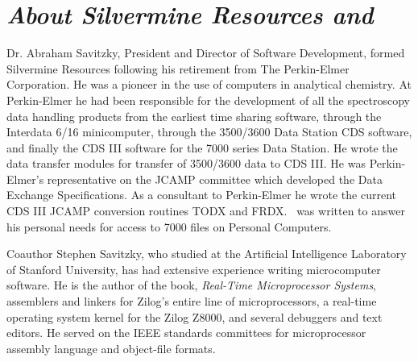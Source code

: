  
\newpage



\section*{{\sl About Silvermine Resources and \RD}}


Dr. Abraham Savitzky, President and Director of Software Development,
formed Silvermine Resources following his retirement from The
Perkin-Elmer Corporation.  He was a pioneer in the use of computers in
analytical chemistry.\cite{as1,as2} At Perkin-Elmer he had been
responsible for the development of all the spectroscopy data handling
products from the earliest time sharing software, through the
Interdata 6/16 minicomputer, through the 3500/3600 Data Station CDS
software, and finally the CDS III software for the 7000 series Data
Station.  He wrote the data transfer modules for transfer of 3500/3600
data to CDS III.  He was Perkin-Elmer's representative on the JCAMP
committee which developed the Data Exchange
Specifications.\cite{JCAMP} As a consultant to Perkin-Elmer he wrote
the current CDS III JCAMP conversion routines TODX and FRDX.  \RD\ was
written to answer his personal needs for access to 7000 files on
Personal Computers.

Coauthor Stephen Savitzky, who studied at the Artificial Intelligence
Laboratory of Stanford University, has had extensive experience
writing microcomputer software.  He is the author of the book, {\em
Real-Time Microprocessor Systems},\cite{ss1} assemblers and linkers
for Zilog's entire line of microprocessors, a real-time operating
system kernel for the Zilog Z8000, and several debuggers and text
editors.  He served on the IEEE standards committees for
microprocessor assembly language\cite{IEEE-694} and object-file
formats.\cite{IEEE-695}

\def\thebibliography#1{\medskip
\noindent\ \hrulefill\ 
\medskip\list
 {[\arabic{enumi}]}{\settowidth\labelwidth{[#1]}\leftmargin\labelwidth
 \advance\leftmargin\labelsep
 \usecounter{enumi}}
 \def\newblock{\hskip .11em plus .33em minus .07em}
 \sloppy\clubpenalty4000\widowpenalty4000
 \sfcode`\.=1000\relax}

